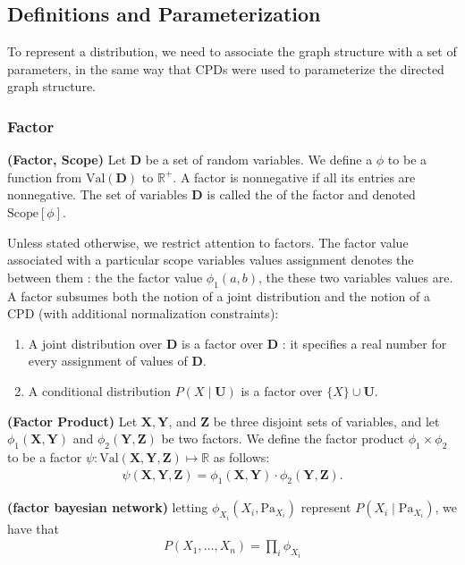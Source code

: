 \documentclass{article}
\newcommand{\bfs}[1]{\textbf{({#1}) }}
\begin{document}
\subsection{Definitions and Parameterization}
To represent a distribution, we need to associate the graph structure with a set of parameters, in the same way that CPDs were used to parameterize the directed graph structure.
\subsubsection{Factor}
\begin{defa}\bfs{Factor, Scope}
 Let $\boldsymbol{D}$ be a set of random variables. We define a  $\phi$ to be a function from $\mathrm{Val}(\boldsymbol{D})$ to $\mathbb{R}^{+}$. A factor is nonnegative if all its entries are nonnegative. The set of variables $\boldsymbol{D}$ is called the  of the factor and denoted  $\mathrm{Scope}[\phi]$.
\end{defa}
\begin{rema}
Unless stated otherwise, we restrict attention to  factors.
The factor value associated with a particular scope variables values assignment denotes the  between them : the  the factor value $\phi_{1}(a, b)$, the  these two variables values are. A factor subsumes both the notion of a joint distribution and the notion of a CPD (with additional normalization constraints):
\begin{enumerate}
    \item A joint distribution over $\boldsymbol{D}$ is a factor over $\boldsymbol{D}$ : it specifies a real number for every assignment of values of $\boldsymbol{D}$.
    \item  A conditional distribution $P(X \mid \boldsymbol{U})$ is a factor over $\{X\} \cup \boldsymbol{U}$.
\end{enumerate} 
\end{rema}
\begin{defa}\bfs{Factor Product}
 Let $\boldsymbol{X}, \boldsymbol{Y}$, and $\boldsymbol{Z}$ be three disjoint sets of variables, and let $\phi_{1}(\boldsymbol{X}, \boldsymbol{Y})$ and $\phi_{2}(\boldsymbol{Y}, \boldsymbol{Z})$ be two factors. We define the factor product $\phi_{1} \times \phi_{2}$ to be a factor $\psi: \mathrm{Val}(\boldsymbol{X}, \boldsymbol{Y}, \boldsymbol{Z}) \mapsto \mathbb{R}$ as follows:
\begin{align*}
\psi(\boldsymbol{X}, \boldsymbol{Y}, \boldsymbol{Z})=\phi_{1}(\boldsymbol{X}, \boldsymbol{Y}) \cdot \phi_{2}(\boldsymbol{Y}, \boldsymbol{Z}) .
\end{align*}
\end{defa}
\begin{rema}\bfs{factor bayesian network}
letting $\phi_{X_{i}}\left(X_{i}, \mathrm{Pa}_{X_{i}}\right)$ represent $P\left(X_{i} \mid \mathrm{Pa}_{X_{i}}\right)$, we have that
\begin{align*}
P\left(X_{1}, \ldots, X_{n}\right)=\prod_{i} \phi_{X_{i}}
\end{align*}
\end{rema}
\end{document}
